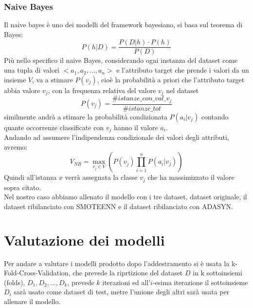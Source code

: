 \documentclass[italian,12pt,a4paper]{article}
\begin{document}
	
	\subsubsection{Naive Bayes}
	
	Il naive bayes è uno dei modelli del framework bayesiano, si basa sul teorema di Bayes:
	$$P(h|D) = \frac{P(D|h)\cdot P(h)}{P(D)}$$
	Più nello specifico il naive Bayes, considerando ogni instanza del dataset come una tupla di valori $<a_1, a_2, \dots, a_n>$ e l'attributo target che prende i valori da un insieme $V$, va a stimare $P(v_j)$, cioè la probabilità a priori che l'attributo target abbia valore $v_j$, con la frequenza relativa del valore $v_j$ nel dataset $$P(v_j) = \frac{\#istanze\_con\_val\_v_j}{\#istanze\_tot}$$ similmente andrà a stimare la probabilità condizionata $P(a_i|v_j)$ contando quante occorrenze classificate con $v_j$ hanno il valore $a_i$. \\
	Andando ad assumere l'indipendenza condizionale dei valori degli attributi, avremo:
	$$V_{NB} = \max_{v_j \in V}(P(v_j)\prod_{i = 1}^{n} P(a_i|v_j))$$
	Quindi all'istanza $x$ verrà assegnata la classe $v_j$ che ha massimizzato il valore sopra citato. \\
	Nel nostro caso abbiamo allenato il modello con i tre dataset, dataset originale, il dataset ribilanciato con SMOTEENN e il dataset ribilanciato con ADASYN.
	
	\section{Valutazione dei modelli}
	Per andare a valutare i modelli prodotto dopo l'addestramento si è usata la k-Fold-Cross-Validation, che prevede la riprtizione del dataset $D$ in k sottoinsiemi (folds), $D_1, D_2, \dots, D_k$, prevede $k$ iterazioni ed all'$i$-esima iterazione il sottoinsieme $D_i$ sarà usato come dataset di test, metre l'unione degli altri sarà usata per allenare il modello.
	
\end{document}
